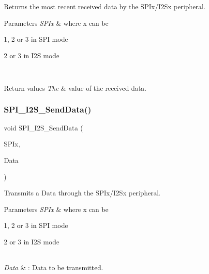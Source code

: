 Returns the most recent received data by the S\+P\+Ix/\+I2\+Sx peripheral. 


\begin{DoxyParams}{Parameters}
{\em S\+P\+Ix} & where x can be
\begin{DoxyItemize}
\item 1, 2 or 3 in S\+PI mode
\item 2 or 3 in I2S mode 
\end{DoxyItemize}\\
\hline
\end{DoxyParams}

\begin{DoxyRetVals}{Return values}
{\em The} & value of the received data. \\
\hline
\end{DoxyRetVals}
\mbox{\label{group___s_p_i___exported___functions_gad5af40bebe8dbe3fa8bd476489d7e3da}} 
\subsubsection{\texorpdfstring{SPI\_I2S\_SendData()}{SPI\_I2S\_SendData()}}
{\footnotesize\ttfamily void S\+P\+I\+\_\+\+I2\+S\+\_\+\+Send\+Data (\begin{DoxyParamCaption}\item[{\mbox{\hyperlink{struct_s_p_i___type_def}{S\+P\+I\+\_\+\+Type\+Def}} $\ast$}]{S\+P\+Ix,  }\item[{uint16\+\_\+t}]{Data }\end{DoxyParamCaption})}



Transmits a Data through the S\+P\+Ix/\+I2\+Sx peripheral. 


\begin{DoxyParams}{Parameters}
{\em S\+P\+Ix} & where x can be
\begin{DoxyItemize}
\item 1, 2 or 3 in S\+PI mode
\item 2 or 3 in I2S mode 
\end{DoxyItemize}\\
\hline
{\em Data} & \+: Data to be transmitted. \\
\hline
\end{DoxyParams}

